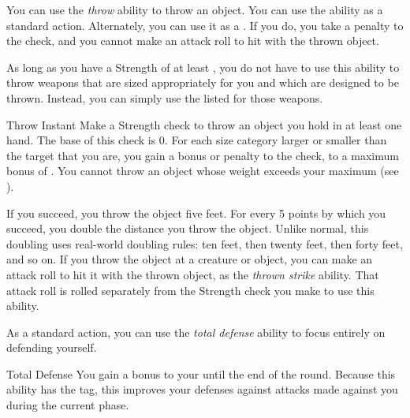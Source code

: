          You can use the \textit{throw} ability to throw an object.
        You can use the ability as a standard action.
        Alternately, you can use it as a .
        If you do, you take a  penalty to the check, and you cannot make an attack roll to hit with the thrown object.

        As long as you have a Strength of at least , you do not have to use this ability to throw weapons that are sized appropriately for you and which are designed to be thrown.
        Instead, you can simply use the listed  for those weapons.

        \begin{instantability}{Throw}
            \label{Throw}
            Instant
            \rankline
            Make a Strength check to throw an object you hold in at least one hand.
            The base  of this check is 0.
            For each size category larger or smaller than the target that you are, you gain a  bonus or penalty to the check, to a maximum bonus of .
            You cannot throw an object whose weight exceeds your maximum  (see ).

            If you succeed, you throw the object five feet.
            For every 5 points by which you succeed, you double the distance you throw the object.
            Unlike normal, this doubling uses real-world doubling rules: ten feet, then twenty feet, then forty feet, and so on.
            If you throw the object at a creature or object, you can make an attack roll to hit it with the thrown object, as the \textit{thrown strike} ability.
            That attack roll is rolled separately from the Strength check you make to use this ability.
        \end{instantability}

         As a standard action, you can use the \textit{total defense} ability to focus entirely on defending yourself.

        \begin{durationability}{Total Defense}
            \label{Total Defense}
            \rankline
            You gain a  bonus to your  until the end of the round.
            Because this ability has the  tag, this improves your defenses against attacks made against you during the current phase.
        \end{durationability}


